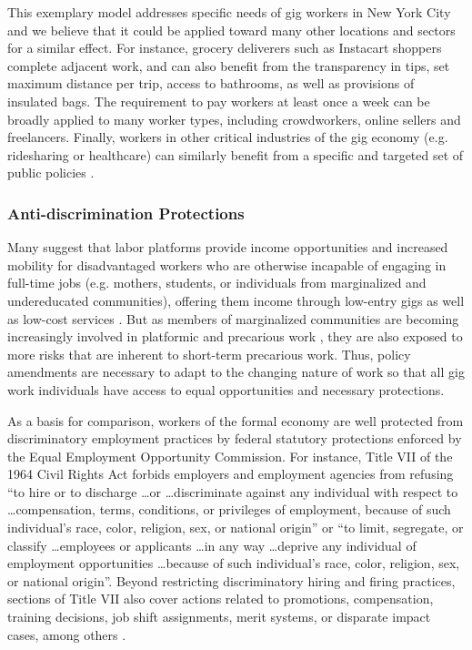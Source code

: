 This exemplary model addresses specific needs of gig workers in New York City and we believe that it could be applied toward many other locations and sectors for a similar effect. For instance, grocery deliverers such as Instacart shoppers complete adjacent work, and can also benefit from the transparency in tips, set maximum distance per trip, access to bathrooms, as well as provisions of insulated bags. The requirement to pay workers at least once a week can be broadly applied to many worker types, including crowdworkers, online sellers and freelancers. Finally, workers in other critical industries of the gig economy (e.g. ridesharing or healthcare) can similarly benefit from a specific and targeted set of public policies \cite{lobel2017gig}.

\subsubsection{Anti-discrimination Protections}
Many suggest that labor platforms provide income opportunities and  increased mobility for  disadvantaged workers who are otherwise incapable of engaging in full-time jobs (e.g. mothers, students, or individuals from marginalized and undereducated communities), offering them income through low-entry gigs as well as low-cost services \cite{Choudary2018-qn,moving}. But as members of marginalized communities are becoming increasingly involved in platformic and precarious work \cite{Dillahunt2021-ky}, they are also exposed to more risks that are inherent to short-term precarious work. Thus, policy amendments are necessary to adapt to the changing nature of work so that all gig work individuals have access to equal opportunities and necessary protections. 

As a basis for comparison, workers of the formal economy are well protected from discriminatory employment practices by federal statutory protections enforced by the Equal Employment Opportunity Commission. For instance, Title VII of the 1964 Civil Rights Act forbids employers and employment agencies from refusing ``to hire or to discharge \dots or \dots discriminate against any individual with respect to \dots compensation, terms, conditions, or privileges of employment, because of such individual's race, color, religion, sex, or national origin'' or ``to limit, segregate, or classify \dots employees or applicants \dots in any way \dots deprive any individual of employment opportunities \dots because of such individual's race, color, religion, sex, or national origin''. Beyond restricting discriminatory hiring and firing practices, sections of Title VII also cover actions related to promotions, compensation, training decisions, job shift assignments, merit systems, or disparate impact cases, among others \cite{noauthor_2019-kq}.

